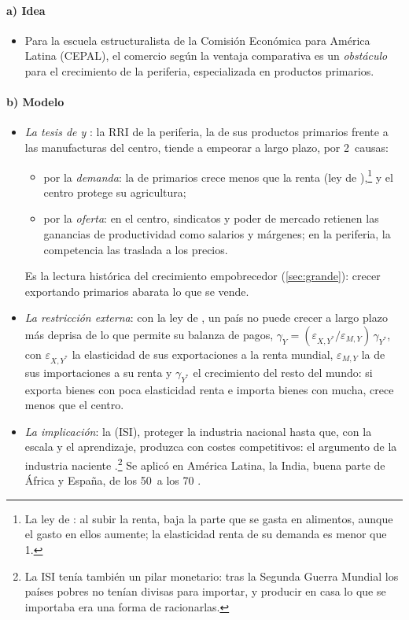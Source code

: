 \documentclass[11pt]{article}
\begin{document}
\paragraph{a) Idea}

\begin{itemize}
\item Para la escuela estructuralista de la Comisión Económica para América Latina (CEPAL), el comercio según la ventaja comparativa es un \emph{obstáculo} para el crecimiento de la periferia, especializada en productos primarios\nocite{Prebisch1949,Singer1950}.
\end{itemize}

\paragraph{b) Modelo}

\begin{itemize}
\item \emph{La tesis de  y }: la RRI de la periferia, la de sus productos primarios frente a las manufacturas del centro, tiende a empeorar a largo plazo, por 2~causas:
  \begin{itemize}
  \item por la \emph{demanda}: la de primarios crece menos que la renta (ley de ),\footnote{La ley de : al subir la renta, baja la parte que se gasta en alimentos, aunque el gasto en ellos aumente; la elasticidad renta de su demanda es menor que 1.} y el centro protege su agricultura;
  \item por la \emph{oferta}: en el centro, sindicatos y poder de mercado retienen las ganancias de productividad como salarios y márgenes; en la periferia, la competencia las traslada a los precios.
  \end{itemize}
  Es la lectura histórica del crecimiento empobrecedor (\ref{sec:grande}): crecer exportando primarios abarata lo que se vende.
\item \emph{La restricción externa}: con la ley de , un país no puede crecer a largo plazo más deprisa de lo que permite su balanza de pagos, $\gamma_Y=(\varepsilon_{X,Y^*}/\varepsilon_{M,Y})\,\gamma_{Y^*}$, con $\varepsilon_{X,Y^*}$ la elasticidad de sus exportaciones a la renta mundial, $\varepsilon_{M,Y}$ la de sus importaciones a su renta y $\gamma_{Y^*}$ el crecimiento del resto del mundo\nocite{Thirlwall1979}: si exporta bienes con poca elasticidad renta e importa bienes con mucha, crece menos que el centro.
\item \emph{La implicación}: la  (ISI), proteger la industria nacional hasta que, con la escala y el aprendizaje, produzca con costes competitivos: el argumento de la industria naciente .\footnote{La ISI tenía también un pilar monetario: tras la Segunda Guerra Mundial los países pobres no tenían divisas para importar, y producir en casa lo que se importaba era una forma de racionarlas\nocite{Irwin2021}.} Se aplicó en América Latina, la India, buena parte de África y España, de los 50~a los 70 .
\end{itemize}
\end{document}
